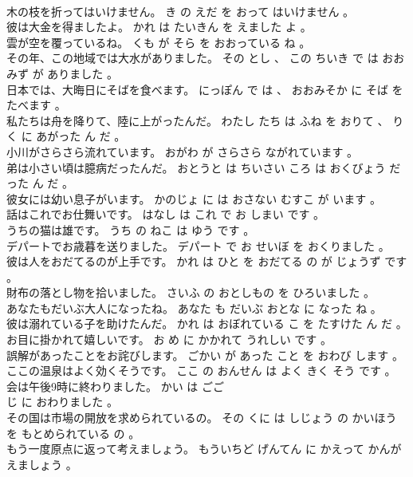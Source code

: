 \documentclass[8pt]{extreport}
\begin{document}
\begin{CJK}{UTF8}{min}
\\	木の枝を折ってはいけません。	き の えだ を おって はいけません 。 
\\	彼は大金を得ましたよ。	かれ は たいきん を えました よ 。 
\\	雲が空を覆っているね。	くも が そら を おおっている ね 。 
\\	その年、この地域では大水がありました。	その とし 、 この ちいき で は おおみず が ありました 。 
\\	日本では、大晦日にそばを食べます。	にっぽん で は 、 おおみそか に そば を たべます 。 
\\	私たちは舟を降りて、陸に上がったんだ。	わたし たち は ふね を おりて 、 りく に あがった ん だ 。 
\\	小川がさらさら流れています。	おがわ が さらさら ながれています 。 
\\	弟は小さい頃は臆病だったんだ。	おとうと は ちいさい ころ は おくびょう だった ん だ 。 
\\	彼女には幼い息子がいます。	かのじょ に は おさない むすこ が います 。 
\\	話はこれでお仕舞いです。	はなし は これ で お しまい です 。 
\\	うちの猫は雄です。	うち の ねこ は ゆう です 。 
\\	デパートでお歳暮を送りました。	デパート で お せいぼ を おくりました 。 
\\	彼は人をおだてるのが上手です。	かれ は ひと を おだてる の が じょうず です 。 
\\	財布の落とし物を拾いました。	さいふ の おとしもの を ひろいました 。 
\\	あなたもだいぶ大人になったね。	あなた も だいぶ おとな に なった ね 。 
\\	彼は溺れている子を助けたんだ。	かれ は おぼれている こ を たすけた ん だ 。 
\\	お目に掛かれて嬉しいです。	お め に かかれて うれしい です 。 
\\	誤解があったことをお詫びします。	ごかい が あった こと を おわび します 。 
\\	ここの温泉はよく効くそうです。	ここ の おんせん は よく きく そう です 。 
\\	会は午後9時に終わりました。	かい は ごご 
\\	じ に おわりました 。 
\\	その国は市場の開放を求められているの。	その くに は しじょう の かいほう を もとめられている の 。 
\\	もう一度原点に返って考えましょう。	もういちど げんてん に かえって かんがえましょう 。 

\end{CJK}
\end{document}
